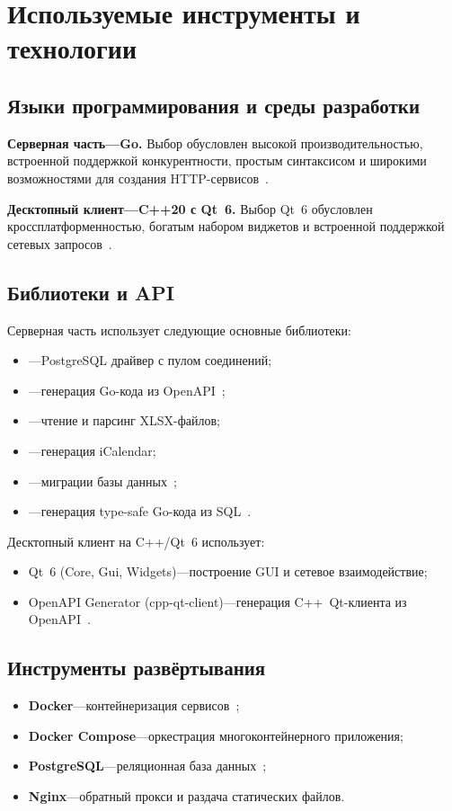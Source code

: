 \chapter{Используемые инструменты и технологии}
\label{cha:tools}

\section{Языки программирования и среды разработки}

\textbf{Серверная часть---Go.} Выбор обусловлен высокой производительностью, встроенной поддержкой конкурентности, простым синтаксисом и широкими возможностями для создания HTTP-сервисов~\cite{go:doc}.

\textbf{Десктопный клиент---C++20 с Qt~6.} Выбор Qt~6 обусловлен кроссплатформенностью, богатым набором виджетов и встроенной поддержкой сетевых запросов~\cite{qt:doc}.

\section{Библиотеки и API}

Серверная часть использует следующие основные библиотеки:
\begin{itemize}
\item {}---PostgreSQL драйвер с пулом соединений;
\item {}---генерация Go-кода из OpenAPI~\cite{oapi:codegen};
\item {}---чтение и парсинг XLSX-файлов;
\item {}---генерация iCalendar;
\item {}---миграции базы данных~\cite{goose:migrate};
\item {}---генерация type-safe Go-кода из SQL~\cite{sqlc:dev}.
\end{itemize}

Десктопный клиент на C++/Qt~6 использует:
\begin{itemize}
\item Qt~6 (Core, Gui, Widgets)---построение GUI и сетевое взаимодействие;
\item OpenAPI Generator (cpp-qt-client)---генерация C++~Qt-клиента из OpenAPI~\cite{openapi:generator}.
\end{itemize}

\section{Инструменты развёртывания}

\begin{itemize}
\item \textbf{Docker}---контейнеризация сервисов~\cite{docker:doc};
\item \textbf{Docker Compose}---оркестрация многоконтейнерного приложения;
\item \textbf{PostgreSQL}---реляционная база данных~\cite{postgres:doc};
\item \textbf{Nginx}---обратный прокси и раздача статических файлов.
\end{itemize}
